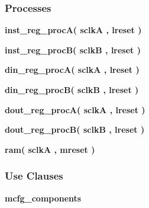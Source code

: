 \subsubsection*{Processes}
 \begin{DoxyCompactItemize}
\item 
{\bf inst\+\_\+reg\+\_\+procA}{\bfseries  ( {\bfseries {\bfseries {\bf sclkA}} \textcolor{vhdlchar}{ }} , {\bfseries {\bfseries {\bf lreset}} \textcolor{vhdlchar}{ }} )}
\item 
{\bf inst\+\_\+reg\+\_\+procB}{\bfseries  ( {\bfseries {\bfseries {\bf sclkB}} \textcolor{vhdlchar}{ }} , {\bfseries {\bfseries {\bf lreset}} \textcolor{vhdlchar}{ }} )}
\item 
{\bf din\+\_\+reg\+\_\+procA}{\bfseries  ( {\bfseries {\bfseries {\bf sclkA}} \textcolor{vhdlchar}{ }} , {\bfseries {\bfseries {\bf lreset}} \textcolor{vhdlchar}{ }} )}
\item 
{\bf din\+\_\+reg\+\_\+procB}{\bfseries  ( {\bfseries {\bfseries {\bf sclkB}} \textcolor{vhdlchar}{ }} , {\bfseries {\bfseries {\bf lreset}} \textcolor{vhdlchar}{ }} )}
\item 
{\bf dout\+\_\+reg\+\_\+procA}{\bfseries  ( {\bfseries {\bfseries {\bf sclkA}} \textcolor{vhdlchar}{ }} , {\bfseries {\bfseries {\bf lreset}} \textcolor{vhdlchar}{ }} )}
\item 
{\bf dout\+\_\+reg\+\_\+procB}{\bfseries  ( {\bfseries {\bfseries {\bf sclkB}} \textcolor{vhdlchar}{ }} , {\bfseries {\bfseries {\bf lreset}} \textcolor{vhdlchar}{ }} )}
\item 
{\bf ram}{\bfseries  ( {\bfseries {\bfseries {\bf sclkA}} \textcolor{vhdlchar}{ }} , {\bfseries {\bfseries {\bf mreset}} \textcolor{vhdlchar}{ }} )}
\end{DoxyCompactItemize}
\subsubsection*{Use Clauses}
 \begin{DoxyCompactItemize}
\item 
{\bf mcfg\+\_\+components}   
\end{DoxyCompactItemize}
